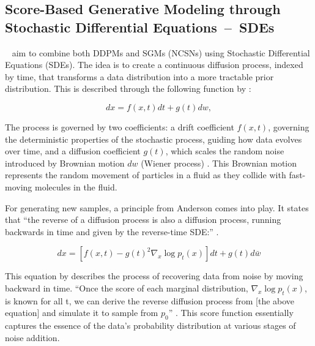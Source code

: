 \subsection{Score-Based Generative Modeling through Stochastic Differential Equations~--~SDEs}\label{SDEs}

~\citeauthor{song2020score} aim to combine both DDPMs and SGMs (NCSNs) using Stochastic Differential Equations (SDEs). The idea is to create a continuous diffusion process, indexed by time, that transforms a data distribution into a more tractable prior distribution. This is described through the following function by \citeauthor{song2020score}:

\[ dx = f(x, t)dt + g(t)dw, \]

The process is governed by two coefficients: a drift coefficient \( f(x, t) \), governing the deterministic properties of the stochastic process, guiding how data evolves over time, and a diffusion coefficient \( g(t) \), which scales the random noise introduced by Brownian motion \( dw \) (Wiener process) \citep{song2020score}. This Brownian motion represents the random movement of particles in a fluid as they collide with fast-moving molecules in the fluid. 


For generating new samples, a  principle from Anderson \citep{anderson1982313} comes into play. It states that ``the reverse of a diffusion process is also a diffusion process, running backwards in time and given by the reverse-time SDE:\@'' \citep{song2020score}.

\[ dx = \left[ f(x, t) - g{(t)}^2 \nabla_x \log p_t(x) \right] dt + g(t)d\bar{w} \]

This equation by \citeauthor{song2020score} describes the process of recovering data from noise by moving backward in time. ``Once the score of each marginal distribution, \(\nabla_x \log p_t(x) \), is known for all t, we can derive the reverse diffusion process from [the above equation] and simulate it to sample from \(p_0\)'' \citep{song2019SGM}. This score function essentially captures the essence of the data's probability distribution at various stages of noise addition.

